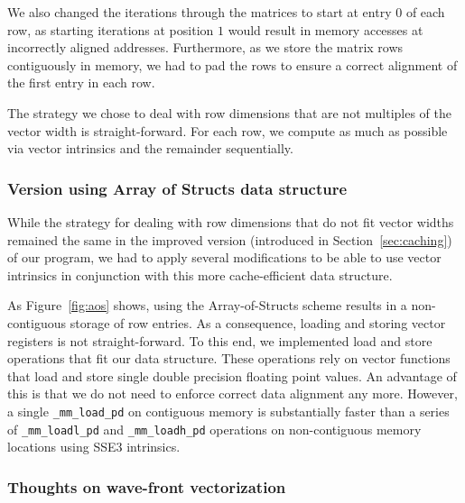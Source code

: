 \documentclass[runningheads,a4paper]{llncs}
\begin{document}
We also changed the iterations through the matrices to start at entry $0$ of each row, as starting iterations at position $1$
would result in memory accesses at incorrectly aligned addresses.
Furthermore, as we store the matrix rows contiguously in memory,
we had to pad the rows to ensure a correct alignment of the first entry in each row.

The strategy we chose to deal with row dimensions that are not multiples of the vector width is straight-forward.
For each row, we compute as much as possible via vector intrinsics and the remainder sequentially.

\subsubsection{Version using Array of Structs data structure}
While the strategy for dealing with row dimensions that do not fit vector widths remained the same in the improved version (introduced in Section~\ref{sec:caching}) of our program,
we had to apply several modifications to be able to use vector intrinsics in conjunction with this more cache-efficient data structure.

As Figure~\ref{fig:aos} shows, using the Array-of-Structs scheme results in a non-contiguous storage of row entries.
As a consequence, loading and storing vector registers is not straight-forward.
To this end, we implemented load and store operations that fit our data structure.
These operations rely on vector functions that load and store single double precision floating point values.
An advantage of this is that we do not need to enforce correct data alignment any more.
However, a single  \texttt{\_mm\_load\_pd} on contiguous memory is substantially faster than a series of \texttt{\_mm\_loadl\_pd} and \texttt{\_mm\_loadh\_pd} operations
on non-contiguous memory locations using SSE3 intrinsics. 

\subsubsection{Thoughts on wave-front vectorization}

\end{document}
